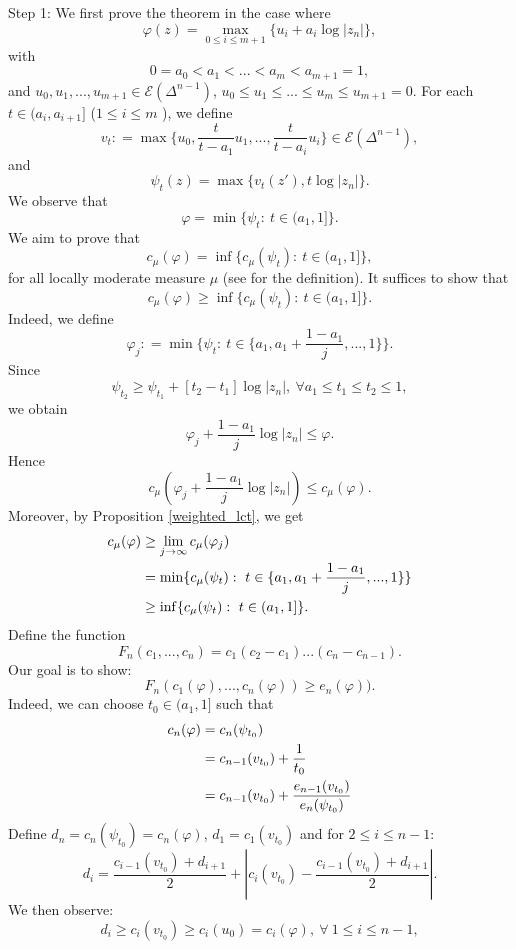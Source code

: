 \documentclass[a4paper,oneside,reqno,11pt]{article}
\begin{document}
Step 1: We first prove the theorem in the case where
$$\varphi ( z ) = \max\limits_{ 0\leq i\leq m + 1 } \{ u_i + a_i \log | z_n | \},$$ 
with 
$$0 = a_0 < a_1 < ... < a_m < a_{ m + 1 } = 1,$$ 
and $u_0, u_1, ..., u_{m+1}\in\mathcal E ( \Delta^{ n - 1 } )$, $u_0\leq u_1\leq ... \leq u_m\leq u_{ m + 1 } = 0$. For each $t\in ( a_i ,a_{ i + 1 } ]$ ($1\leq i\leq m$ ), we define
$$v_t: = \max \{ u_0 , \frac { t } { t - a_1 } u_1,..., \frac { t } { t - a_i } u_i \} \in\mathcal E ( \Delta^{ n - 1 }),$$
and
$$\psi_t ( z ) = \max \{ v_t ( z' ), t \log | z_n | \}.$$
We observe that
$$\varphi = \min\{ \psi_t:\ t\in (a_1 , 1 ] \}.$$
We aim to prove that 
$$c_{ \mu } (\varphi ) = \inf\{ c_{ \mu } ( \psi_t ) :\  t\in (a_1 , 1 ]\},$$
for all locally moderate measure $\mu$ (see \cite{DNS10} for the definition). It suffices to show that
$$c_{ \mu } (\varphi ) \geq \inf\{ c_{ \mu } ( \psi_t ):\ t\in (a_1 , 1 ]\}.$$
Indeed, we define
$$\varphi_{ j }: = \min\{ \psi_t :\ t\in \{ a_1, a_1 + \frac { 1 - a_1 } { j }, ..., 1 \} \}.$$
Since 
$$\psi _{ t_2 } \geq \psi _{ t_1 } + [ t_2 - t_1 ]  \log | z_n |,\ \forall a_1\leq t_1\leq t_2\leq 1,$$ 
we obtain
$$\varphi_{ j } + \frac { 1 - a_1 } { j } \log | z_n | \leq \varphi.$$
Hence 
$$c_{ \mu } ( \varphi_{ j } + \frac { 1 - a_1 } { j } \log | z_n | )  \leq c_{ \mu } ( \varphi ).$$
Moreover, by Proposition \ref{weighted_lct}, we get
$$\aligned
c_{\mu } ( \varphi ) &\geq \lim\limits_{ j\to \infty } c_{ \mu } ( \varphi_{ j } )\\
&=\min\{ c_{ \mu } ( \psi_t ):\ t\in \{ a_1, a_1 + \frac { 1 - a_1 } { j }, ..., 1 \} \}\\
&\geq \inf\{ c_{ \mu } ( \psi_t ):\ t\in (a_1 , 1 ]\}.
\endaligned$$
Define the function
$$F_n (c_1,...,c_n) = c_1( c_2-c_1 ) ... ( c_{n} - c_{n-1} ).$$
Our goal is to show:
$$F_n ( c_1 ( \varphi ), ... , c_{ n } ( \varphi  ) )\geq e_n ( \varphi ) ).$$
Indeed, we can choose $t_0\in (a_1 , 1 ]$ such that
$$\aligned 
c_n ( \varphi ) &= c_n ( \psi_{ t_0 } )\\
&= c_{ n - 1 } ( v_{ t_0 } ) + \frac { 1 } { t_0 }\\
&= c_{ n - 1 } ( v_{ t_0 } ) + \frac { e_{ n - 1 } ( v_{ t_0 } ) } { e_n ( \psi_{ t_0 } ) }
\endaligned$$
Define $d_n = c_n ( \psi_{ t_0 } ) = c_n ( \varphi )$, $d_1 = c_1 ( v_{ t_0 } )$ and for $2\leq i\leq n-1$:
$$d_{i} = \frac { c_{ i - 1 } ( v_{ t_0 } ) + d_{ i + 1 } }  { 2 } + | c_{ i } ( v_{ t_0 } ) -  \frac { c_{ i - 1 } ( v_{ t_0 } ) + d_{ i + 1 } }  { 2 } |.$$
We then observe:
$$d_i\geq c_i ( v_{ t_0 } )\geq c_i (u_0) = c_i ( \varphi ),\ \forall\ 1\leq i\leq n-1,$$
\end{document}
